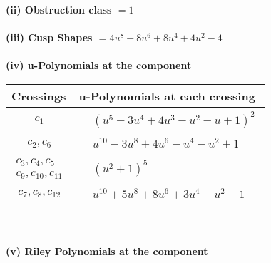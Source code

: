 \documentclass[1p]{elsarticle_modified}
\theoremstyle{definition}
\begin{document}
\flushleft \textbf{(ii) Obstruction class $= 1$}\\~\\
\flushleft \textbf{(iii) Cusp Shapes $= 4 u^8-8 u^6+8 u^4+4 u^2-4$}\\~\\
\newpage\renewcommand{\arraystretch}{1}
\flushleft \textbf{(iv) u-Polynomials at the component}\newline \\
\begin{tabular}{m{50pt}|m{274pt}}
Crossings & \hspace{64pt}u-Polynomials at each crossing \\
\hline $$\begin{aligned}c_{1}\end{aligned}$$&$\begin{aligned}
&(u^5-3 u^4+4 u^3- u^2- u+1)^2
\end{aligned}$\\
\hline $$\begin{aligned}c_{2},c_{6}\end{aligned}$$&$\begin{aligned}
&u^{10}-3 u^8+4 u^6- u^4- u^2+1
\end{aligned}$\\
\hline $$\begin{aligned}c_{3},c_{4},c_{5}\\c_{9},c_{10},c_{11}\end{aligned}$$&$\begin{aligned}
&(u^2+1)^5
\end{aligned}$\\
\hline $$\begin{aligned}c_{7},c_{8},c_{12}\end{aligned}$$&$\begin{aligned}
&u^{10}+5 u^8+8 u^6+3 u^4- u^2+1
\end{aligned}$\\
\hline
\end{tabular}\\~\\
\newpage\renewcommand{\arraystretch}{1}
\flushleft \textbf{(v) Riley Polynomials at the component}\newline \\
\end{document}
